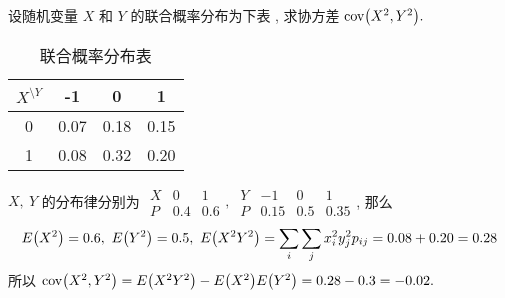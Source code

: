\begin{example}[2002 数三]
    设随机变量 $X$ 和 $Y$ 的联合概率分布为下表 , 求协方差 $\mathrm{cov}\qty(X^2,Y^2).$
\end{example}
\begin{solution}
    \begin{minipage}{0.3\linewidth}
        \begin{table}[H]
            \centering
            \caption*{联合概率分布表}
            \begin{tabular}{c | c c c}
                $X^{\displaystyle\setminus Y}$ & -1   & 0    & 1    \\
                \midrule
                0                              & 0.07 & 0.18 & 0.15 \\
                1                              & 0.08 & 0.32 & 0.20
            \end{tabular}
        \end{table}
    \end{minipage}\hfill
    \begin{minipage}{0.66\linewidth}
        $X,~Y$ 的分布律分别为 $\begin{array}{c|cc}
                X & 0   & 1   \\\hline
                P & 0.4 & 0.6
            \end{array},~\begin{array}{c|ccc}
                Y & -1   & 0   & 1    \\\hline
                P & 0.15 & 0.5 & 0.35
            \end{array}$, 那么
        $$E\qty(X^2)=0.6,~E\qty(Y^2)=0.5,~E\qty(X^2Y^2)=\sum_i\sum_j x_i^2y_j^2 p_{ij}=0.08+0.20=0.28$$
        所以 $\mathrm{cov}\qty(X^2,Y^2)=E\qty(X^2Y^2)-E\qty(X^2)E\qty(Y^2)=0.28-0.3=-0.02.$
    \end{minipage}
\end{solution}

